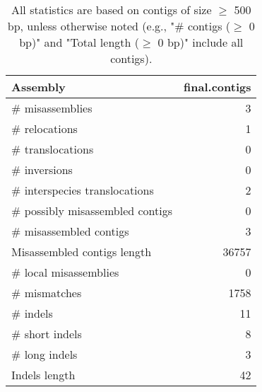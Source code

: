 \documentclass[12pt,a4paper]{article}
\begin{document}
\begin{table}[ht]
\begin{center}
\caption{All statistics are based on contigs of size $\geq$ 500 bp, unless otherwise noted (e.g., "\# contigs ($\geq$ 0 bp)" and "Total length ($\geq$ 0 bp)" include all contigs).}
\begin{tabular}{|l*{1}{|r}|}
\hline
Assembly & final.contigs \\ \hline
\# misassemblies & 3 \\ \hline
\hspace{5mm}\# relocations & 1 \\ \hline
\hspace{5mm}\# translocations & 0 \\ \hline
\hspace{5mm}\# inversions & 0 \\ \hline
\hspace{5mm}\# interspecies translocations & 2 \\ \hline
\# possibly misassembled contigs & 0 \\ \hline
\# misassembled contigs & 3 \\ \hline
Misassembled contigs length & 36757 \\ \hline
\# local misassemblies & 0 \\ \hline
\# mismatches & 1758 \\ \hline
\# indels & 11 \\ \hline
\hspace{5mm}\# short indels & 8 \\ \hline
\hspace{5mm}\# long indels & 3 \\ \hline
Indels length & 42 \\ \hline
\end{tabular}
\end{center}
\end{table}
\end{document}
